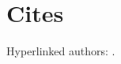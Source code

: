\documentclass[english]{scrbook}
\begin{document}
\chapter{Cites}
Hyperlinked authors: \citeauthor{ABC01} \cite{ABC01}.
\nocite{*}
\printbibliography
\end{document}
